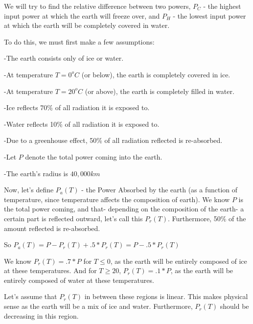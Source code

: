 \documentclass{article}
\begin{document}
We will try to find the relative difference between two powers, $P_C$ - the highest input power at which the earth will freeze over, and $P_H$ - the lowest input power at which the earth will be completely covered in water. 

To do this, we must first make a few assumptions:

-The earth consists only of ice or water. 

-At temperature $T=0^oC$ (or below), the earth is completely covered in ice. 

-At temperature $T=20^oC$ (or above), the earth is completely filled in water.

-Ice reflects 70\% of all radiation it is exposed to.

-Water reflects 10\% of all radiation it is exposed to.

-Due to a greenhouse effect, 50\% of all radiation reflected is re-absorbed.

-Let $P$ denote the total power coming into the earth.

-The earth's radius is $40,000km$

Now, let's define $P_a(T)$ - the Power Absorbed by the earth (as a function of temperature, since temperature affects the composition of earth). We know $P$ is the total power coming, and that- depending on the composition of the earth- a certain part is reflected outward, let's call this $P_r(T)$. Furthermore, 50\% of the amount reflected is re-absorbed. 

So $P_a(T) = P - P_r(T) + .5*P_r(T) = P - .5*P_r(T)$

We know $P_r(T) = .7*P$ for $T \le 0$, as the earth will be entirely composed of ice at these temperatures. And for $T \ge 20$, $P_r(T) = .1*P$, as the earth will be entirely composed of water at these temperatures.

Let's assume that $P_r(T)$ in between these regions is linear. This makes physical sense as the earth will be a mix of ice and water. Furthermore, $P_r(T)$ should be decreasing in this region. 
\end{document}
